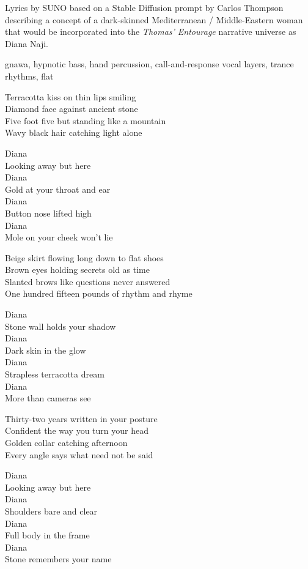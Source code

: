 
\begin{notes}
Lyrics by SUNO based on a Stable Diffusion prompt by Carlos Thompson describing a concept of a dark-skinned Mediterranean / Middle-Eastern woman %
that would be incorporated into the \emph{Thomas’ Entourage} narrative universe as Diana Naji.
\end{notes}
\begin{style}
gnawa, hypnotic bass, hand percussion, call-and-response vocal layers, trance rhythms, flat
\end{style}
\begin{lyrics}
Terracotta kiss on thin lips smiling\\
Diamond face against ancient stone\\
Five foot five but standing like a mountain\\
Wavy black hair catching light alone

Diana\\
Looking away but here\\
Diana\\
Gold at your throat and ear\\
Diana\\
Button nose lifted high\\
Diana\\
Mole on your cheek won't lie

Beige skirt flowing long down to flat shoes\\
Brown eyes holding secrets old as time\\
Slanted brows like questions never answered\\
One hundred fifteen pounds of rhythm and rhyme

Diana\\
Stone wall holds your shadow\\
Diana\\
Dark skin in the glow\\
Diana\\
Strapless terracotta dream\\
Diana\\
More than cameras see

Thirty-two years written in your posture\\
Confident the way you turn your head\\
Golden collar catching afternoon\\
Every angle says what need not be said

Diana\\
Looking away but here\\
Diana\\
Shoulders bare and clear\\
Diana\\
Full body in the frame\\
Diana\\
Stone remembers your name
\end{lyrics}

